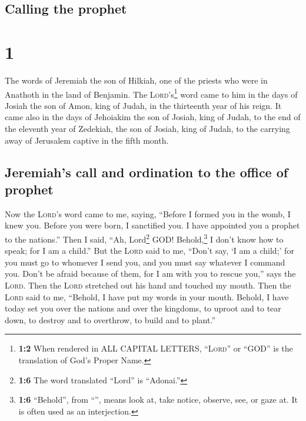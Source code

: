 \hypertarget{calling-the-prophet}{%
\subsection{Calling the prophet}\label{calling-the-prophet}}

\hypertarget{section}{%
\section{1}\label{section}}

 The words of Jeremiah the son of Hilkiah, one of the
priests who were in Anathoth in the land of Benjamin.  The
\textsc{Lord}'s\footnote{\textbf{1:2} When rendered in ALL CAPITAL
  LETTERS, ``\textsc{Lord}'' or ``GOD'' is the translation of God's
  Proper Name.} word came to him in the days of Josiah the son of Amon,
king of Judah, in the thirteenth year of his reign.  It
came also in the days of Jehoiakim the son of Josiah, king of Judah, to
the end of the eleventh year of Zedekiah, the son of Josiah, king of
Judah, to the carrying away of Jerusalem captive in the fifth month.

\hypertarget{jeremiahs-call-and-ordination-to-the-office-of-prophet}{%
\subsection{Jeremiah's call and ordination to the office of
prophet}\label{jeremiahs-call-and-ordination-to-the-office-of-prophet}}

 Now the \textsc{Lord}'s word came to me, saying,
 ``Before I formed you in the womb, I knew you. Before you
were born, I sanctified you. I have appointed you a prophet to the
nations.''  Then I said, ``Ah, Lord\footnote{\textbf{1:6}
  The word translated ``Lord'' is ``Adonai.''} GOD! Behold,\footnote{\textbf{1:6}
  ``Behold'', from ``'', means look at, take notice,
  observe, see, or gaze at. It is often used as an interjection.} I
don't know how to speak; for I am a child.''  But the
\textsc{Lord} said to me, ``Don't say, `I am a child;' for you must go
to whomever I send you, and you must say whatever I command you.
 Don't be afraid because of them, for I am with you to
rescue you,'' says the \textsc{Lord}.  Then the
\textsc{Lord} stretched out his hand and touched my mouth. Then the
\textsc{Lord} said to me, ``Behold, I have put my words in your mouth.
 Behold, I have today set you over the nations and over
the kingdoms, to uproot and to tear down, to destroy and to overthrow,
to build and to plant.''

